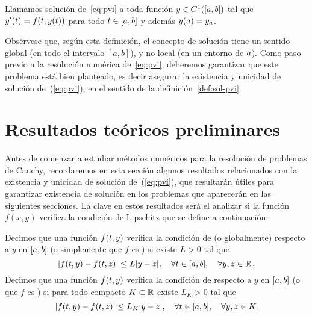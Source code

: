 \begin{definition}
  \label{def:sol-pvi}
  Llamamos solución de~\eqref{eq:pvi} a toda función $\sol\in
  C^1([\ta,\tb])$ tal que $\sol'(\tt)=f(\tt,\sol(\tt))$ para todo
  $\tt\in[\ta,\tb]$ y además $\sol(\ta)=\ycero$.\label{def:3}
\end{definition}

Obsérvese que, según esta definición, el concepto de solución tiene un
sentido global (en todo el intervalo $[a,b]$), y no local (en un entorno
de $\ta$). Como paso previo a la resolución numérica
de~\eqref{eq:pvi}, deberemos garantizar que este problema está bien
planteado, es decir asegurar la existencia y unicidad de solución
de~(\ref{eq:pvi}), en el sentido de la definición~\ref{def:sol-pvi}.

\section{Resultados teóricos preliminares}
\label{sec:tema4:resultados-teoricos}

Antes de comenzar a estudiar métodos numéricos para la resolución de
problemas de Cauchy, recordaremos en esta sección algunos
resultados relacionados con la existencia y unicidad de solución
de~(\ref{eq:pvi}), que resultarán útiles para garantizar existencia de
solución en los problemas que aparecerán en las siguientes secciones.
La clave en estos resultados será el analizar si la función $f(x,y)$
verifica la condición de Lipschitz que se define a continuación:

\begin{definition}
  \label{def:lipschitz}
  Decimos que una función $f(\tt,y)$ verifica la condición de
   (o globalmente) respecto a $y$ en
    $[\ta,\tb]$ (o simplemente que $f$ es \globLipschitz)
    si existe $L>0$ tal que
  \begin{equation*}
    |f(\tt,y) - f(\tt,z)| \le L |y-z|, \quad \forall \tt\in [\ta,\tb],
    \quad  \forall y,z\in \Rset.
  \end{equation*}
  Decimos que una función $f(\tt,y)$ verifica la condición de
   respecto a $y$ en
  $[\ta,\tb]$ (o que $f$ es \locLipschitz) si para todo compacto
  $K\subset\Rset$ existe $L_K>0$ tal que
  \begin{equation*}
    |f(\tt,y) - f(\tt,z)| \le L_K |y-z|, \quad \forall \tt\in [\ta,\tb],
    \quad  \forall y,z\in K.
  \end{equation*}
\end{definition}

